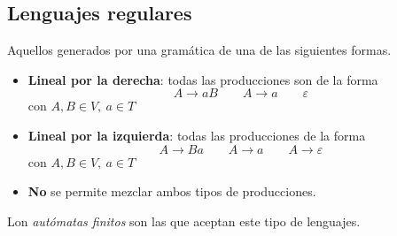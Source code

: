 \subsection{Lenguajes regulares}
Aquellos generados por una gramática de una de las siguientes formas.

\begin{itemize}
  \item \textbf{Lineal por la derecha}: todas las producciones son de la forma
    \[A \rightarrow aB \qquad A \rightarrow a \qquad \varepsilon\]
    con $A,B \in V,~ a \in T$
  \item \textbf{Lineal por la izquierda}: todas las producciones de la forma
    \[A \rightarrow Ba \qquad A \rightarrow a \qquad A \rightarrow \varepsilon\]
    con $A,B \in V,~ a \in T$
  \item \textbf{No} se permite mezclar ambos tipos de producciones.
\end{itemize}
Lon \textit{autómatas finitos} son las que aceptan este tipo de lenguajes.

